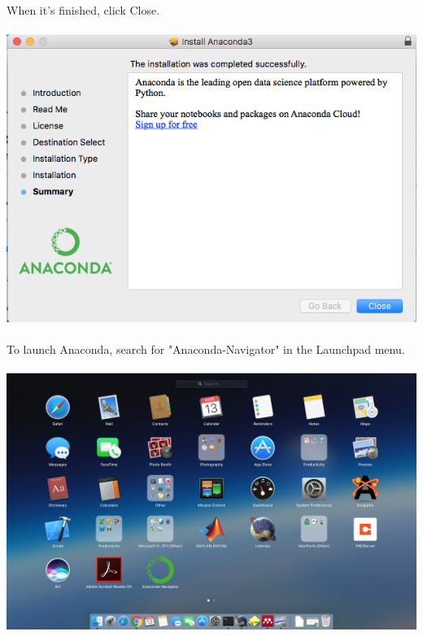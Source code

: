 \documentclass[]{article}
\begin{document}
\paragraph{}
When it's finished, click Close. 
\paragraph{}
\begin{centering}
    \centerline{\includegraphics[scale=0.5]{Screenshot_11.png}}
\end{centering}

\clearpage
\paragraph{}
To launch Anaconda, search for "Anaconda-Navigator" in the Launchpad menu.
\paragraph{}
\begin{centering}
    \centerline{\includegraphics[scale=0.25]{Screenshot_13.png}}
\end{centering}
\end{document}
